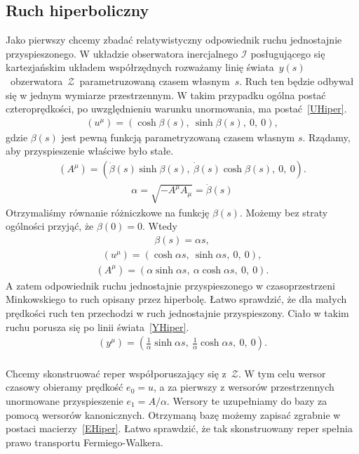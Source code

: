 \subsection{Ruch hiperboliczny}
Jako pierwszy chcemy zbadać relatywistyczny odpowiednik ruchu jednostajnie 
przyspieszonego.
W układzie obserwatora inercjalnego $\mathcal{I}$ posługującego się 
kartezjańskim układem współrzędnych rozważamy linię 
świata~$y(s)$~obzerwatora~$\mathcal{Z}$~parametruzowaną czasem własnym~$s$.
Ruch ten będzie odbywał się w jednym wymiarze przestrzennym. 
W takim przypadku ogólna postać czteroprędkości, po uwzględnieniu warunku 
unormowania, ma postać~\eqref{UHiper}.
\begin{align}\label{UHiper}
(u^\mu) = (\cosh \beta( s ),\ \sinh \beta( s ),\ 0,\   0),
\end{align}
gdzie $\beta( s)$ jest pewną funkcją parametryzowaną czasem własnym $s$.
Rządamy, aby przyspieszenie właściwe było stałe.
\begin{align}\nonumber
(A^\mu) = ( \dot{\beta}( s ) \sinh \beta( s ),\ 
\dot{\beta}( s ) \cosh \beta( s ),\ 0,\ 0 ).
\end{align}
\begin{align}\nonumber
\alpha = \sqrt{ - A^\mu A_\mu } = \dot{\beta}( s )
\end{align}
Otrzymaliśmy równanie różniczkowe na funkcję $\beta(s)$. 
Możemy bez straty ogólności przyjąć, że $\beta(0)  = 0$. Wtedy
\begin{align}\nonumber
\beta( s ) = \alpha s,
\end{align}
\begin{align}\nonumber
(u^\mu) = (\cosh \alpha s ,\ \sinh \alpha s ,\ 0,\   0),
\end{align}
\begin{align}\nonumber
(A^\mu) = ( \alpha \sinh \alpha s,\ \alpha \cosh \alpha s,\ 0,\ 0 ).
\end{align}
A zatem odpowiednik ruchu jednostajnie przyspieszonego w
czasoprzestrzeni Minkowskiego to ruch opisany przez hiperbolę.
Łatwo sprawdzić, że dla małych prędkości ruch ten przechodzi 
w ruch jednostajnie przyspieszony. Ciało w takim ruchu porusza
się po linii świata~\eqref{YHiper}.
\begin{align}\label{YHiper}
(y^\mu) = \left( \frac{1}{\alpha} \sinh \alpha s,\ 
\frac{1}{\alpha} \cosh \alpha s,\ 0,\ 0 \right).
\end{align}
\\
Chcemy skonstruować reper współporuszający się z~$\mathcal{Z}$. 
W tym celu wersor czasowy obieramy prędkość $e_0 = u$, 
a za pierwszy z wersorów przestrzennych unormowane 
przyspieszenie $e_1 = A/\alpha$.
Wersory te uzupełniamy do bazy za pomocą wersorów kanonicznych.
Otrzymaną bazę możemy zapisać zgrabnie w postaci 
macierzy~\eqref{EHiper}.
Łatwo sprawdzić, że tak skonstruowany reper spełnia
prawo transportu Fermiego-Walkera.

